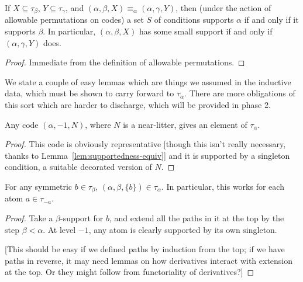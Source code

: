 \begin{lemma}
  \label{lem:supportedness-equiv}
  If $X \subseteq \tau_\beta$, $Y \subseteq \tau_\gamma$, and $(\alpha,\beta,X) \equiv_\alpha (\alpha,\gamma,Y)$, then (under the action of allowable permutations on codes) a set $S$ of conditions supports $\alpha$ if and only if it supports $\beta$.  In particular,  $(\alpha,\beta,X)$ has some small support if and only if $(\alpha,\gamma,Y)$ does.
\end{lemma}

\begin{proof}
  Immediate from the definition of allowable permutations.
\end{proof}

We state a couple of easy lemmas which are things we assumed in the inductive data, which must be shown to carry forward to $\tau_\alpha$.  There are more obligations of this sort which are harder to discharge, which will be provided in phase 2.

\begin{lemma}
\label{def:typed-near-litter}
Any code $(\alpha,-1,N)$, where $N$ is a near-litter, gives an element of $\tau_{\alpha}$.
\end{lemma}

\begin{proof}
This code is obviously representative [though this isn’t really necessary, thanks to Lemma~\ref{lem:supportedness-equiv}] and it is supported by a singleton condition, a suitable decorated version of $N$.
\end{proof}

\begin{lemma}
\label{def:typed-singleton}
For any symmetric $b \in \tau_\beta$, $(\alpha,\beta,\{b\}) \in \tau_\alpha$. In particular, this works for each atom $a \in \tau_{-a}$.
\end{lemma}

\begin{proof}
Take a $\beta$-support for $b$, and extend all the paths in it at the top by the step $\beta < \alpha$.  At level $-1$, any atom is clearly supported by its own singleton.

[This should be easy if we defined paths by induction from the top; if we have paths in reverse, it may need lemmas on how derivatives interact with extension at the top.  Or they might follow from functoriality of derivatives?]
\end{proof}

